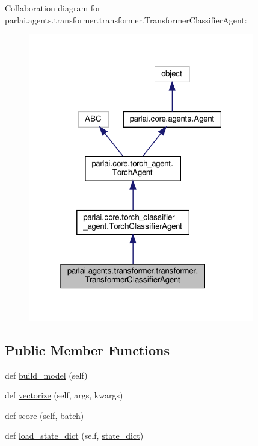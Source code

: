 Collaboration diagram for parlai.\+agents.\+transformer.\+transformer.\+Transformer\+Classifier\+Agent\+:
\nopagebreak
\begin{figure}[H]
\begin{center}
\leavevmode
\includegraphics[width=280pt]{d0/dc7/classparlai_1_1agents_1_1transformer_1_1transformer_1_1TransformerClassifierAgent__coll__graph}
\end{center}
\end{figure}
\subsection*{Public Member Functions}
\begin{DoxyCompactItemize}
\item 
def \hyperlink{classparlai_1_1agents_1_1transformer_1_1transformer_1_1TransformerClassifierAgent_a0f9c5184483a7bc0d0162ecc2cdeab5b}{build\+\_\+model} (self)
\item 
def \hyperlink{classparlai_1_1agents_1_1transformer_1_1transformer_1_1TransformerClassifierAgent_aee8f573263ce8a01ae1c1f2353ba3e58}{vectorize} (self, args, kwargs)
\item 
def \hyperlink{classparlai_1_1agents_1_1transformer_1_1transformer_1_1TransformerClassifierAgent_a2ba169f62c0d0e69945de1ced8e39556}{score} (self, batch)
\item 
def \hyperlink{classparlai_1_1agents_1_1transformer_1_1transformer_1_1TransformerClassifierAgent_a939ce95291954f4cce7a1acfd101c896}{load\+\_\+state\+\_\+dict} (self, \hyperlink{classparlai_1_1core_1_1torch__agent_1_1TorchAgent_a9f89e606931a4622a5c6a6f6b832235c}{state\+\_\+dict})
\end{DoxyCompactItemize}
